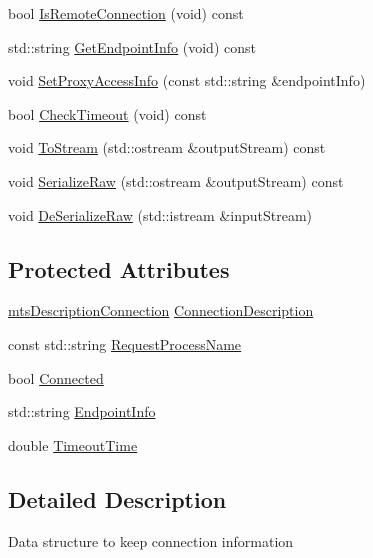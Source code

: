 \begin{DoxyCompactItemize}
bool \hyperlink{classmts_connection_ac1299d1d2ab8168b017950fc372268f4}{Is\-Remote\-Connection} (void) const 
\item 
std\-::string \hyperlink{classmts_connection_a995804182172f108d74d7921e8335884}{Get\-Endpoint\-Info} (void) const 
\item 
void \hyperlink{classmts_connection_ae3cb5e96eb3b93919f1a43d3f4ec19be}{Set\-Proxy\-Access\-Info} (const std\-::string \&endpoint\-Info)
\item 
bool \hyperlink{classmts_connection_a60f579a4b4c6b4e08497b48ed4ef41a4}{Check\-Timeout} (void) const 
\item 
void \hyperlink{classmts_connection_ac622a2e9885cfbbc588f9a08a0849f38}{To\-Stream} (std\-::ostream \&output\-Stream) const 
\item 
void \hyperlink{classmts_connection_a2a29a2b202174b39c7b0f93d18791fb5}{Serialize\-Raw} (std\-::ostream \&output\-Stream) const 
\item 
void \hyperlink{classmts_connection_a893608b72a416d37013db5d036482100}{De\-Serialize\-Raw} (std\-::istream \&input\-Stream)
\end{DoxyCompactItemize}
\subsection*{Protected Attributes}
\begin{DoxyCompactItemize}
\item 
\hyperlink{classmts_description_connection}{mts\-Description\-Connection} \hyperlink{classmts_connection_a0a529fcb9c6627e79c49eb05265dd43e}{Connection\-Description}
\item 
const std\-::string \hyperlink{classmts_connection_a81c4b5147db8f46d70b30c7fabbc72c8}{Request\-Process\-Name}
\item 
bool \hyperlink{classmts_connection_a2384cf6081cf01b9330bf6810108c2b5}{Connected}
\item 
std\-::string \hyperlink{classmts_connection_ad5e701a7d4fe0a27b084d0f8d161c7d6}{Endpoint\-Info}
\item 
double \hyperlink{classmts_connection_a6c190911c627762bcdc0a2145a6739c8}{Timeout\-Time}
\end{DoxyCompactItemize}


\subsection{Detailed Description}
Data structure to keep connection information 

